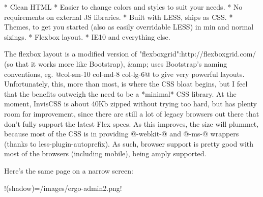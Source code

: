* Clean HTML
* Easier to change colors and styles to suit your needs. 
* No requirements on external JS libraries.
* Built with LESS, ships as CSS.
* Themes, to get you started (also as easily overridable LESS) in min and normal sizings.
* Flexbox layout.
* IE10 and everything else.

The flexbox layout is a modified version of "flexboxgrid":http://flexboxgrid.com/ (so that it works more like Bootstrap), &amp; uses Bootstrap's naming conventions, eg. @col-sm-10 col-md-8 col-lg-6@ to give very powerful layouts. Unfortunately, this, more than most, is where the CSS bloat begins, but I feel that the benefits outweigh the need to be a *minimal* CSS library. At the moment, InvisCSS is about 40Kb zipped without trying too hard, but has plenty room for improvement, since there are still a lot of legacy browsers out there that don't fully support the latest Flex specs. As this improves, the size will plummet, because most of the CSS is in providing @-webkit-@ and @-ms-@ wrappers (thanks to less-plugin-autoprefix). As such, browser support is pretty good with most of the browsers (including mobile), being amply supported.

Here's the same page on a narrow screen:


!(shadow)=/images/ergo-admin2.png!

